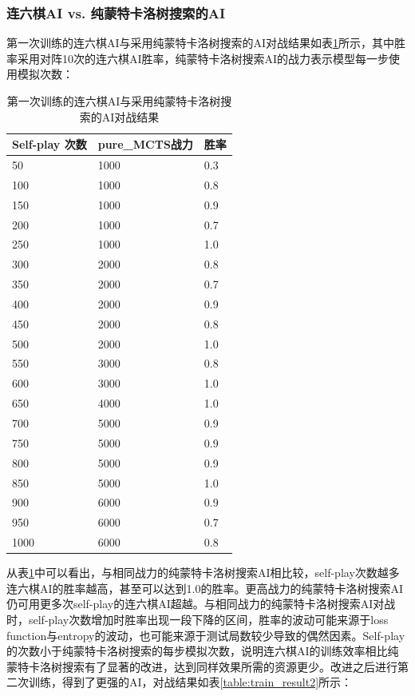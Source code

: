 \documentclass[c5size]{ctexart}
\begin{document}
		\subsubsection{连六棋AI vs. 纯蒙特卡洛树搜索的AI}
			第一次训练的连六棋AI与采用纯蒙特卡洛树搜索的AI对战结果如表\ref{table:train_result1}所示，其中胜率采用对阵10次的连六棋AI胜率，纯蒙特卡洛树搜索AI的战力表示模型每一步使用模拟次数：
			\begin{table}[!htbp]
				\centering
				\caption{第一次训练的连六棋AI与采用纯蒙特卡洛树搜索的AI对战结果}
				\label{table:train_result1}
				\begin{tabular}{lll}
					\toprule
					Self-play 次数 & pure\_MCTS战力 &胜率 \\
					\midrule
					50          & 1000             & 0.3 \\
					100         & 1000             & 0.8 \\
					150         & 1000             & 0.9 \\
					200         & 1000             & 0.7 \\
					250         & 1000             & 1.0 \\
					300         & 2000             & 0.8 \\
					350         & 2000             & 0.7 \\
					400         & 2000             & 0.9 \\
					450         & 2000             & 0.8 \\
					500         & 2000             & 1.0 \\
					550         & 3000             & 0.8 \\
					600         & 3000             & 1.0 \\
					650         & 4000             & 1.0 \\
					700         & 5000             & 0.9 \\
					750         & 5000             & 0.9 \\
					800         & 5000             & 0.9 \\
					850         & 5000             & 1.0 \\
					900         & 6000             & 0.9 \\
					950         & 6000             & 0.7 \\
					1000        & 6000             & 0.8\\
					\bottomrule
				\end{tabular}
			\end{table}
		从表\ref{table:train_result1}中可以看出，与相同战力的纯蒙特卡洛树搜索AI相比较，self-play次数越多连六棋AI的胜率越高，甚至可以达到1.0的胜率。更高战力的纯蒙特卡洛树搜索AI仍可用更多次self-play的连六棋AI超越。与相同战力的纯蒙特卡洛树搜索AI对战时，self-play次数增加时胜率出现一段下降的区间，胜率的波动可能来源于loss function与entropy的波动，也可能来源于测试局数较少导致的偶然因素。Self-play的次数小于纯蒙特卡洛树搜索的每步模拟次数，说明连六棋AI的训练效率相比纯蒙特卡洛树搜索有了显著的改进，达到同样效果所需的资源更少。改进之后进行第二次训练，得到了更强的AI，对战结果如表\ref{table:train_result2}所示：
		
\end{document}
